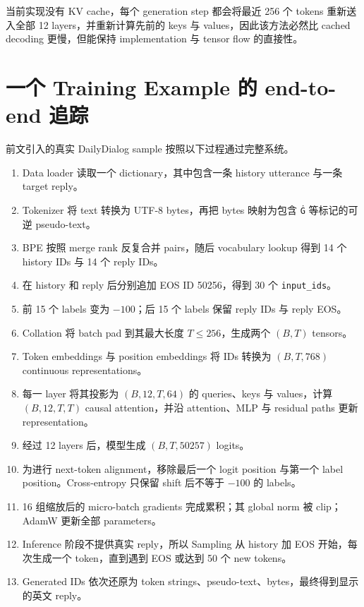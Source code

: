 \documentclass[12pt]{article}
\begin{document}
当前实现没有 KV cache，每个 generation step 都会将最近 256 个 tokens 重新送入全部 12 layers，并重新计算先前的 keys 与 values，因此该方法必然比 cached decoding 更慢，但能保持 implementation 与 tensor flow 的直接性。

\section{一个 Training Example 的 end-to-end 追踪}

前文引入的真实 DailyDialog sample 按照以下过程通过完整系统。
\begin{enumerate}
  \item Data loader 读取一个 dictionary，其中包含一条 history utterance 与一条 target reply。
  \item Tokenizer 将 text 转换为 UTF-8 bytes，再把 bytes 映射为包含 \texttt{\string Ġ} 等标记的可逆 pseudo-text。
  \item BPE 按照 merge rank 反复合并 pairs，随后 vocabulary lookup 得到 14 个 history IDs 与 14 个 reply IDs。
  \item 在 history 和 reply 后分别追加 EOS ID 50256，得到 30 个 \texttt{input\_ids}。
  \item 前 15 个 labels 变为 $-100$；后 15 个 labels 保留 reply IDs 与 reply EOS。
  \item Collation 将 batch pad 到其最大长度 $T\leq256$，生成两个 $(B,T)$ tensors。
  \item Token embeddings 与 position embeddings 将 IDs 转换为 $(B,T,768)$ continuous representations。
  \item 每一 layer 将其投影为 $(B,12,T,64)$ 的 queries、keys 与 values，计算 $(B,12,T,T)$ causal attention，并沿 attention、MLP 与 residual paths 更新 representation。
  \item 经过 12 layers 后，模型生成 $(B,T,50257)$ logits。
  \item 为进行 next-token alignment，移除最后一个 logit position 与第一个 label position。Cross-entropy 只保留 shift 后不等于 $-100$ 的 labels。
  \item 16 组缩放后的 micro-batch gradients 完成累积；其 global norm 被 clip；AdamW 更新全部 parameters。
  \item Inference 阶段不提供真实 reply，所以 Sampling 从 history 加 EOS 开始，每次生成一个 token，直到遇到 EOS 或达到 50 个 new tokens。
  \item Generated IDs 依次还原为 token strings、pseudo-text、bytes，最终得到显示的英文 reply。
\end{enumerate}
\end{document}
